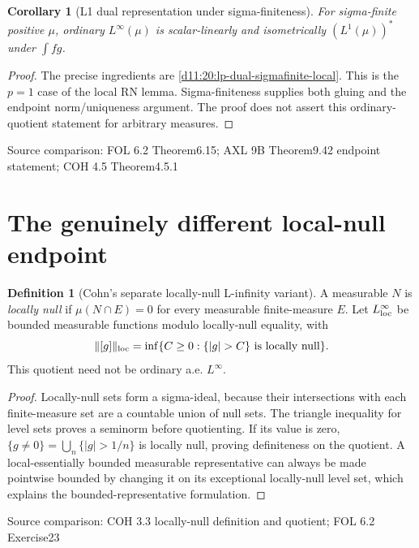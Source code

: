 \documentclass[11pt,oneside,openany]{book}
\newtheorem{corollary}[theorem]{Corollary}
\theoremstyle{definition}
\newtheorem{definition}[theorem]{Definition}
\theoremstyle{remark}
\newcommand{\family}[1]{}
\newcommand{\source}[1]{\par\begingroup\small\sffamily\color{black!65}Source comparison: #1\par\endgroup}
\begin{document}
\begin{corollary}[L1 dual representation under sigma-finiteness]\family{D11.20.lone_dual_sigmafinite}\label{d11:20:lone-dual-sigmafinite}
For sigma-finite positive $\mu$, ordinary $L^\infty(\mu)$ is scalar-linearly and isometrically $(L^1(\mu))^*$ under $\int fg$.
\end{corollary}
\begin{proof}
The precise ingredients are \cref{d11:20:lp-dual-sigmafinite-local}. This is the $p=1$ case of the local RN lemma. Sigma-finiteness supplies both gluing and the endpoint norm/uniqueness argument. The proof does not assert this ordinary-quotient statement for arbitrary measures.
\end{proof}
\source{FOL 6.2 Theorem6.15; AXL 9B Theorem9.42 endpoint statement; COH 4.5 Theorem4.5.1}

\section{The genuinely different local-null endpoint}

\begin{definition}[Cohn's separate locally-null L-infinity variant]\family{D11.20.local_null_variant}\label{d11:20:local-null-variant}
A measurable $N$ is \emph{locally null} if $\mu(N\cap E)=0$ for every measurable finite-measure $E$. Let $L^\infty_{\rm loc}$ be bounded measurable functions modulo locally-null equality, with
\[\|[g]\|_{\rm loc}=\inf\{C\ge0:\{|g|>C\}\text{ is locally null}\}.
\]
This quotient need not be ordinary a.e. $L^\infty$.
\end{definition}
\begin{proof}
Locally-null sets form a sigma-ideal, because their intersections with each finite-measure set are a countable union of null sets. The triangle inequality for level sets proves a seminorm before quotienting. If its value is zero, $\{g\ne0\}=\bigcup_n\{|g|>1/n\}$ is locally null, proving definiteness on the quotient. A local-essentially bounded measurable representative can always be made pointwise bounded by changing it on its exceptional locally-null level set, which explains the bounded-representative formulation.
\end{proof}
\source{COH 3.3 locally-null definition and quotient; FOL 6.2 Exercise23}
\end{document}
